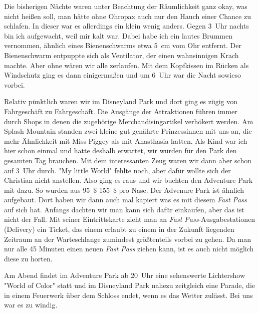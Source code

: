 Die bisherigen Nächte waren unter Beachtung der Räumlichkeit ganz okay, was nicht heißen soll, man hätte ohne Ohropax auch nur den Hauch einer Chance zu schlafen.
In dieser war es allerdings ein klein wenig anders.
Gegen 3~Uhr nachts bin ich aufgewacht, weil mir kalt war.
Dabei habe ich ein lautes Brummen vernommen, ähnlich eines Bienenschwarms etwa 5~cm vom Ohr entfernt.
Der Bienenschwarm entpuppte sich als Ventilator, der einen wahnsinnigen Krach machte.
Aber ohne wären wir alle zerlaufen.
Mit dem Kopfkissen im Rücken als Windschutz ging es dann einigermaßen und um 6~Uhr war die Nacht sowieso vorbei.

Relativ pünktlich waren wir im Disneyland Park und dort ging es zügig von Fahrgeschäft zu Fahrgeschäft.
Die Ausgänge der Attraktionen führen immer durch Shops in denen die zugehörige Merchandisingartikel verhökert werden.
Am Splash-Mountain standen zwei kleine gut genährte Prinzessinnen mit uns an, die mehr Ähnlichkeit mit Miss Piggey als mit Anasthasia hatten. 
Als Kind war ich hier schon einmal und hatte deshalb erwartet, wir würden für den Park den gesamten Tag brauchen.
Mit dem interessanten Zeug waren wir dann aber schon auf 3~Uhr durch.
"My little World" fehlte noch, aber dafür wollte sich der Christian nicht anstellen.
Also ging es raus und wir buchten den Adventure Park mit dazu.
So wurden aus 95~\$ 155~\$ pro Nase.
Der Advenure Park ist ähnlich aufgebaut.
Dort haben wir dann auch mal kapiert was es mit diesem \emph{Fast Pass} auf sich hat.
Anfangs dachten wir man kann sich dafür einkaufen, aber das ist nicht der Fall.
Mit seiner Eintrittskarte zieht man an \emph{Fast Pass}-Ausgabestationen (Delivery) ein Ticket, das einem erlaubt zu einem in der Zukunft liegenden Zeitraum an der Warteschlange zumindest größtenteils vorbei zu gehen.
Da man nur alle 45 Minuten einen neuen \emph{Fast Pass} ziehen kann, ist es auch nicht möglich diese zu horten.

Am Abend findet im Adventure Park ab 20~Uhr eine sehenswerte Lichtershow "World of Color" statt und im Disneyland Park nahezu zeitgleich eine Parade, die in einem Feuerwerk über dem Schloss endet, wenn es das Wetter zulässt.
Bei uns war es zu windig.
